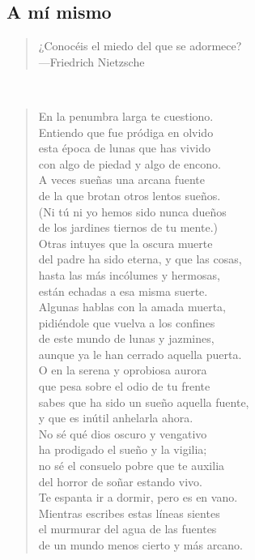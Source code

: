 \documentclass[a4paper, 12pt]{article}
\begin{document}
\pagebreak

\subsection{A mí mismo}

\scriptsize
\begin{quote}
    \hspace*{\fill}¿Conocéis el miedo del que se adormece?\\
\hspace*{\fill}—Friedrich Nietzsche
\end{quote}
\normalsize
~

\begin{verse}
    
En la penumbra larga te cuestiono.\\
Entiendo que fue pródiga en olvido\\
esta época de lunas que has vivido\\
con algo de piedad y algo de encono.\\
A veces sueñas una arcana fuente\\
de la que brotan otros lentos sueños.\\
(Ni tú ni yo hemos sido nunca dueños\\
de los jardines tiernos de tu mente.)\\
Otras intuyes que la oscura muerte\\
del padre ha sido eterna, y que las cosas,\\
hasta las más incólumes y hermosas,\\
están echadas a esa misma suerte.\\
Algunas hablas con la amada muerta,\\
pidiéndole que vuelva a los confines\\
de este mundo de lunas y jazmines,\\
aunque ya le han cerrado aquella puerta.\\
O en la serena y oprobiosa aurora\\
que pesa sobre el odio de tu frente\\
sabes que ha sido un sueño aquella fuente,\\
y que es inútil anhelarla ahora.\\
No sé qué dios oscuro y vengativo\\
ha prodigado el sueño y la vigilia;\\
no sé el consuelo pobre que te auxilia\\
del horror de soñar estando vivo.\\
Te espanta ir a dormir, pero es en vano.\\
Mientras escribes estas líneas sientes\\
el murmurar del agua de las fuentes\\
de un mundo menos cierto y más arcano.\\
\end{verse}
\end{document}
